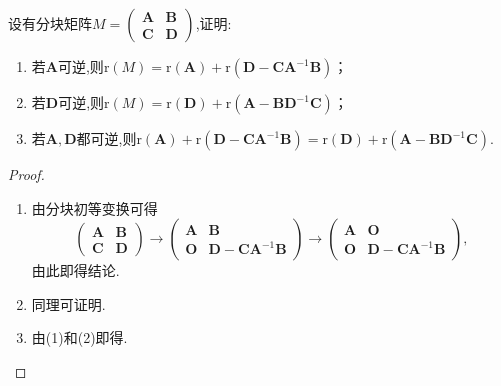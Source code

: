 \documentclass[../../main.tex]{subfiles}%
\begin{document}
\begin{proposition}[秩的降阶公式]\label{proposition:秩的降阶公式}
设有分块矩阵\(M = \begin{pmatrix}
\boldsymbol{A}&\boldsymbol{B}\\
\boldsymbol{C}&\boldsymbol{D}
\end{pmatrix}\),证明:
\begin{enumerate}[(1)]
\item 若\(\boldsymbol{A}\)可逆,则\(\mathrm{r}(M)=\mathrm{r}(\boldsymbol{A})+\mathrm{r}(\boldsymbol{D}-\boldsymbol{C}\boldsymbol{A}^{-1}\boldsymbol{B})\)；

\item 若\(\boldsymbol{D}\)可逆,则\(\mathrm{r}(M)=\mathrm{r}(\boldsymbol{D})+\mathrm{r}(\boldsymbol{A}-\boldsymbol{B}\boldsymbol{D}^{-1}\boldsymbol{C})\)；

\item 若\(\boldsymbol{A},\boldsymbol{D}\)都可逆,则\(\mathrm{r}(\boldsymbol{A})+\mathrm{r}(\boldsymbol{D}-\boldsymbol{C}\boldsymbol{A}^{-1}\boldsymbol{B})=\mathrm{r}(\boldsymbol{D})+\mathrm{r}(\boldsymbol{A}-\boldsymbol{B}\boldsymbol{D}^{-1}\boldsymbol{C})\).
\end{enumerate}
\end{proposition}
\begin{proof}
\begin{enumerate}[(1)]
\item 由分块初等变换可得
\[
\begin{pmatrix}
\boldsymbol{A}&\boldsymbol{B}\\
\boldsymbol{C}&\boldsymbol{D}
\end{pmatrix}\to
\begin{pmatrix}
\boldsymbol{A}&\boldsymbol{B}\\
\boldsymbol{O}&\boldsymbol{D}-\boldsymbol{C}\boldsymbol{A}^{-1}\boldsymbol{B}
\end{pmatrix}\to
\begin{pmatrix}
\boldsymbol{A}&\boldsymbol{O}\\
\boldsymbol{O}&\boldsymbol{D}-\boldsymbol{C}\boldsymbol{A}^{-1}\boldsymbol{B}
\end{pmatrix},
\]
由此即得结论.

\item 同理可证明.

\item 由(1)和(2)即得. 
\end{enumerate}

\end{proof}
\end{document}

